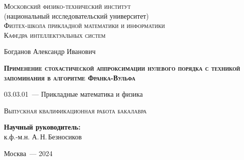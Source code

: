 \thispagestyle{empty}

\begin{titlepage}
    \begin{center}
        \textsc{Московский физико-технический институт}\\
        (национальный исследовательский университет)\\
        \textsc{Физтех-школа прикладной математики и информатики}\\
        \textsc{Кафедра интеллектуальных систем}
    \end{center}
    \vspace{2.5cm}
    \begin{center}
        {Богданов Александр Иванович}
        \par
        \vspace{2cm}
        {\Large \textsc{\textbf{Применение стохастической аппроксимации нулевого порядка с техникой запоминания в алгоритме Франка-Вульфа}}}
        \par
        \vspace{2cm}
        {03.03.01~--- Прикладные математика и физика}
        \par
        \vspace{2cm}
        \textsc{Выпускная квалификационная работа бакалавра}
    \end{center}
    \vspace{2cm}
    \hfill\parbox{8,4cm}{\textbf{Научный руководитель:}
    \\к.ф.-м.н. А.\,Н.\,Безносиков}
    \par
    \vspace{2cm}
    \begin{center}
        {Москва~--- 2024}
    \end{center}
\end{titlepage}